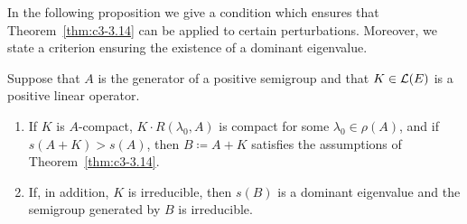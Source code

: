 In the following proposition we give a condition which ensures that Theorem~\ref{thm:c3-3.14} can be applied to certain perturbations. 
Moreover, we state a criterion ensuring the existence of a dominant eigenvalue.
\begin{proposition}\label{prop:c3-3.18}
Suppose that $A$ is the generator of a positive semigroup and that $K \in \mathcal{L}(E)$ is a positive linear operator.
%
\begin{enumerate}[\upshape(i)]
\item
If\/ $K$ is $A$-compact, \ie $K\cdot R(\lambda_{0},A)$ is compact for some
$\lambda_{0} \in \rho(A)$, and if\/ $s(A+K) > s(A)$, then
$B \coloneq A + K$ satisfies the assumptions of Theorem~\ref{thm:c3-3.14}.%
\item
If, in addition, $K$ is irreducible, then $s(B)$ is a dominant eigenvalue and the semigroup generated by $B$ is irreducible.
\end{enumerate}
\end{proposition}
